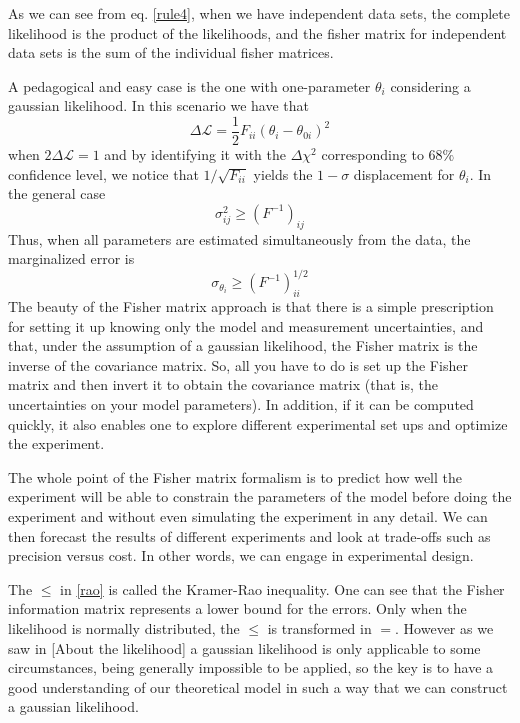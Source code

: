 \documentclass[onecolumn,           %
               showpacs,            %
               preprintnumbers,     %
               aps,                 %
               prl,          	    %
               letterpaper,             %
               superscriptaddress,      %
               nofootinbib,         %
               tightenlines,        %
               floats,floatfix      %
               ,usenatbib,
               ]{revtex4-1}
\begin{document}
As we can see from eq. \eqref{rule4}, when we have independent data sets, the complete likelihood is the product of the likelihoods, and the fisher matrix for independent data sets is the sum of the individual fisher matrices. 

A pedagogical and easy case is the one with one-parameter $\theta_i$ considering a gaussian likelihood. In this scenario we have that
\begin{equation}
\Delta \mathcal{L}=\frac{1}{2}F_{ii}(\theta_i- \theta_{0i})^2
\end{equation}
when $2\Delta\mathcal{L}=1$ and by identifying it with the $\Delta \chi^2$ corresponding to $68\%$ confidence level, we notice that $1/\sqrt{F_{ii}}$ yields the $1-\sigma$ displacement for $\theta_i$. In the general case
\begin{equation}\label{rao}
\sigma_{ij}^2 \geq (F^{-1})_{ij}
\end{equation}
Thus, when all parameters are estimated simultaneously from the data, the marginalized error is
\begin{equation}
\sigma_{\theta_i}\geq (F^{-1})^{1/2}_{ii}
\end{equation}
The beauty of the Fisher matrix approach is that there is a simple prescription for setting it up knowing only the model and measurement uncertainties, and that, under the assumption of a gaussian likelihood, the Fisher matrix is the inverse of the covariance matrix. So, all you have to do is set up the Fisher matrix and then invert it to obtain the covariance matrix (that is, the uncertainties on your model parameters). In addition, if it can be computed quickly, it also enables one to explore different experimental set ups and optimize the experiment.

The whole point of the Fisher matrix formalism is to predict how well the experiment will be able to constrain the parameters of the model before doing the experiment and without even simulating the experiment in any detail. We can then forecast the results of different experiments and look at trade-offs such as precision versus cost. In other words, we can engage in experimental design.

The $\leq$ in \eqref{rao} is called the Kramer-Rao inequality. One can see that the Fisher information matrix represents a lower bound for the errors. Only when the likelihood is normally distributed, the $\leq$ is transformed in $=$. However as we saw in [About the likelihood] a gaussian likelihood is only applicable to some circumstances, being generally impossible to be applied, so the key is to have a good understanding of our theoretical model in such a way that we can construct a gaussian likelihood.
\end{document}

